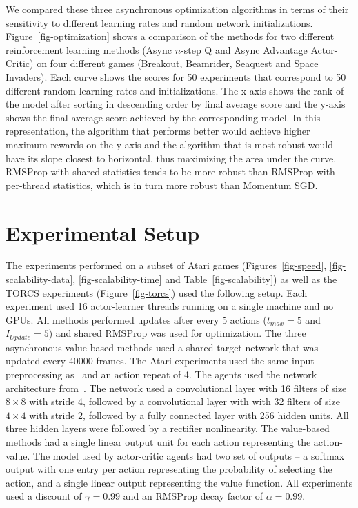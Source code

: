 \documentclass{article} \usepackage{times}
\begin{document}
We compared these three asynchronous optimization algorithms in terms of their sensitivity to different learning rates and random network initializations.
Figure~\ref{fig-optimization} shows a comparison of the methods for two different reinforcement learning methods (Async $n$-step Q and Async Advantage Actor-Critic) on four different games (Breakout, Beamrider, Seaquest and Space Invaders).
Each curve shows the scores for 50 experiments that correspond to 50 different random learning rates and initializations.
The x-axis shows the rank of the model after sorting in descending order by final average score and the y-axis shows the final average score achieved by the corresponding model.
In this representation, the algorithm that performs better would achieve higher maximum rewards on the y-axis and the algorithm that is most robust would have its slope closest to horizontal, thus maximizing the area under the curve.
RMSProp with shared statistics tends to be more robust than RMSProp with per-thread statistics, which is in turn more robust than Momentum SGD.

\section{Experimental Setup}
\label{sec:experimental-setup}
The experiments performed on a subset of Atari games (Figures~\ref{fig-speed}, \ref{fig-scalability-data}, \ref{fig-scalability-time} and Table~\ref{fig-scalability}) as well as the TORCS experiments (Figure~\ref{fig-torcs}) used the following setup.  Each experiment used 16 actor-learner threads running on a single machine and no GPUs.
All methods performed updates after every 5 actions ($t_{max}=5$ and $I_{Update}=5$) and shared RMSProp was used for optimization.
The three asynchronous value-based methods used a shared target network that was updated every 40000 frames.
The Atari experiments used the same input preprocessing as~\cite{mnih-dqn-2015} and an action repeat of 4.
The agents used the network architecture from~\cite{mnih-atari-2013}.
The network used a convolutional layer with 16 filters of size $8\times 8$ with stride 4, followed by a convolutional layer with with 32 filters of size $4\times 4$ with stride 2, followed by a fully connected layer with 256 hidden units.
All three hidden layers were followed by a rectifier nonlinearity.
The value-based methods had a single linear output unit for each action representing the action-value.
The model used by actor-critic agents had two set of outputs -- a softmax output with one entry per action representing the probability of selecting the action, and a single linear output representing the value function.
All experiments used a discount of $\gamma=0.99$ and an RMSProp decay factor of $\alpha=0.99$.
\end{document}
